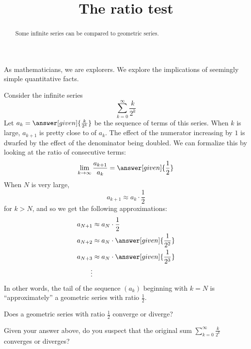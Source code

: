 \documentclass{ximera}
\title[Dig-In:]{The ratio test}
\begin{document}
\begin{abstract}
Some infinite series can be compared to geometric series.
\end{abstract}
\maketitle

As mathematicians, we are explorers. We explore the implications of
seemingly simple quantitative facts. 

\begin{exploration}
Consider the infinite series
\[
\sum_{k=0}^\infty \frac{k}{2^k}
\]
Let $a_k = \answer[given]{\frac{k}{2^k}}$ be the sequence of terms of
this series.  When $k$ is large, $a_{k+1}$ is pretty close to
 of $a_{k}$.  The
effect of the numerator increasing by $1$ is dwarfed by the effect of
the denominator being doubled.  We can formalize this by looking at
the ratio of consecutive terms:
\[
\lim_{k \to \infty} \frac{a_{k+1}}{a_k} = \answer[given]{\frac{1}{2}}
\]
When $N$ is very large,
\[
a_{k+1} \approx a_k\cdot \frac{1}{2}
\]
for $k>N$, and so we get the following approximations:
\begin{align*}
  a_{N+1} &\approx a_N\cdot \frac{1}{2} \\
  a_{N+2} &\approx a_N\cdot \answer[given]{\frac{1}{2^2}} \\
  a_{N+3} &\approx a_N\cdot \answer[given]{\frac{1}{2^3}}\\
\vdots
\end{align*}
In other words, the tail of the sequence $(a_k)$ beginning with $k=N$
is ``approximately'' a geometric series with ratio $\frac{1}{2}$.

\begin{question}
Does a geometric series with ratio $\frac{1}{2}$ converge or diverge?
\begin{prompt}
  \begin{multipleChoice}
  \end{multipleChoice}
\end{prompt}
\begin{question}
  Given your answer above, do you suspect that the original sum
  $\sum_{k=0}^\infty \frac{k}{2^k}$ converges or diverges?
  \begin{prompt}
    \begin{multipleChoice}
    \end{multipleChoice}
  \end{prompt}
\end{question}
\end{question}
\end{exploration}
\end{document}
